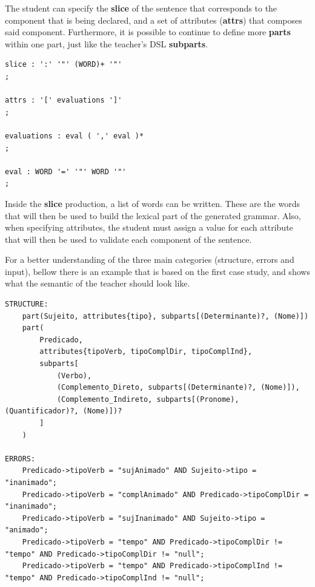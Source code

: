 The student can specify the \textbf{slice} of the sentence that corresponds to the component that is being declared, and a set of attributes (\textbf{attrs}) that composes said component. Furthermore, it is possible to continue to define more \textbf{parts} within one part, just like the teacher's \textsc{DSL} \textbf{subparts}.

\begin{center}
\begin{minipage}{8cm}
\begin{Verbatim}[frame=single, framesep=2mm]
slice : ':' '"' (WORD)+ '"'
;

attrs : '[' evaluations ']'
;

evaluations : eval ( ',' eval )*
;

eval : WORD '=' '"' WORD '"'
;
\end{Verbatim}
\end{minipage}
\end{center}


Inside the \textbf{slice} production, a list of words can be written. These are the words that will then be used to build the lexical part of the generated grammar. Also, when specifying attributes, the student must assign a value for each attribute that will then be used to validate each component of the sentence.

For a better understanding of the three main categories (structure, errors and input), bellow there is an example that is based on the first case study, and shows what the semantic of the teacher should look like.
\newpage

\begin{center}
\begin{minipage}{13cm}
\begin{Verbatim}[frame=single, framesep=2mm, fontsize=\tiny]
STRUCTURE:
    part(Sujeito, attributes{tipo}, subparts[(Determinante)?, (Nome)])
    part(
        Predicado,
        attributes{tipoVerb, tipoComplDir, tipoComplInd},
        subparts[
            (Verbo),
            (Complemento_Direto, subparts[(Determinante)?, (Nome)]),
            (Complemento_Indireto, subparts[(Pronome), (Quantificador)?, (Nome)])?
        ]
    )

ERRORS:
    Predicado->tipoVerb = "sujAnimado" AND Sujeito->tipo = "inanimado";
    Predicado->tipoVerb = "complAnimado" AND Predicado->tipoComplDir = "inanimado";
    Predicado->tipoVerb = "sujInanimado" AND Sujeito->tipo = "animado";
    Predicado->tipoVerb = "tempo" AND Predicado->tipoComplDir != "tempo" AND Predicado->tipoComplDir != "null";
    Predicado->tipoVerb = "tempo" AND Predicado->tipoComplInd != "tempo" AND Predicado->tipoComplInd != "null";
\end{Verbatim}
\end{minipage}
\end{center}

